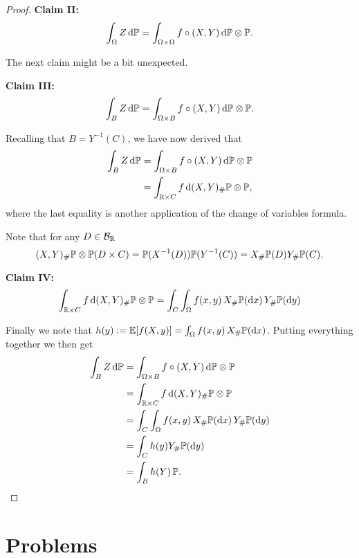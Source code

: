 \begin{proof}
\textbf{Claim II:}
\[
	\int_\Omega Z \, \mathrm{d} \mathbb P = \int_{\Omega \times \Omega} f \circ (X,Y) \, \mathrm{d} \mathbb P \otimes \mathbb P.
\]


The next claim might be a bit unexpected.

\textbf{Claim III:}
\[
	\int_{B} Z \, \mathrm{d} \mathbb P = \int_{\Omega \times B} f \circ (X,Y) \, \mathrm{d} \mathbb P \otimes \mathbb P.
\]

Recalling that $B = Y^{-1}(C)$, we have now derived that
\begin{align*}
	\int_{B} Z \, \mathrm{d} \mathbb P &= \int_{\Omega \times B} f \circ (X,Y) \, \mathrm{d} \mathbb P \otimes \mathbb P\\
	&= \int_{\mathbb R \times C} f \, \mathrm{d} (X,Y)_\# \mathbb P \otimes \mathbb P,
\end{align*}
where the last equality is another application of the change of variables formula.

Note that for any $D \in \mathcal B_{\mathbb R}$
\[
	(X,Y)_\# \mathbb P \otimes \mathbb P(D \times C) = \mathbb P(X^{-1}(D)) \mathbb P(Y^{-1}(C)) 
	= X_\# \mathbb P(D) Y_\# \mathbb P(C).
\]

\textbf{Claim IV:}
\[
	\int_{\mathbb R \times C} f \, \mathrm{d} (X,Y)_\# \mathbb P \otimes \mathbb P
	= \int_C \int_\Omega f(x,y) \, X_\#\mathbb P(\mathrm{d} x) \, Y_\# \mathbb P (\mathrm{d} y)
\]

Finally we note that $h(y) := \mathbb E[f(X,y)] = \int_\Omega f(x,y) \, X_\#\mathbb P(\mathrm{d} x)$. Putting everything together we then get
\begin{align*}
	\int_{B} Z \, \mathrm{d} \mathbb P &= \int_{\Omega \times B} f \circ (X,Y) \, \mathrm{d} \mathbb P \otimes \mathbb P\\
	&= \int_{\mathbb R \times C} f \, \mathrm{d} (X,Y)_\# \mathbb P \otimes \mathbb P\\
	&= \int_C \int_\Omega f(x,y) \, X_\#\mathbb P(\mathrm{d} x) \, Y_\# \mathbb P (\mathrm{d} y)\\
	&= \int_C h(y) Y_\# \mathbb P(\mathrm{d} y) \\
	&= \int_B h(Y) \, \mathbb P.
\end{align*}

\end{proof}


\section{Problems}


